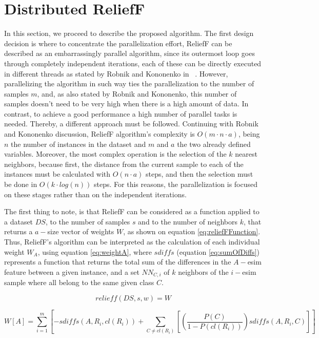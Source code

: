 \section{Distributed ReliefF}
\label{sec:dreliefF}
In this section, we proceed to describe the proposed algorithm. The first design decision is where to concentrate the parallelization effort, ReliefF can be described as an embarrassingly parallel algorithm, since its outermost loop goes through completely independent iterations, each of these can be directly executed in different threads as stated by Robnik and Kononenko in ~\cite{Robnik2003}. However, parallelizing the algorithm in such way ties the parallelization to the number of samples $m$, and, as also stated by Robnik and Kononenko, this number of samples doesn't need to be very high when there is a high amount of data. In contrast, to achieve a good performance a high number of parallel tasks is needed. Thereby, a different approach must be followed. Continuing with Robnik and Kononenko discussion, ReliefF algorithm's complexity is $O(m \cdot n \cdot a)$, being $n$ the number of instances in the dataset and $m$ and $a$ the two already defined variables. Moreover, the most complex operation is the selection of the $k$ nearest neighbors, because first, the distance from the current sample to each of the instances must be calculated with $O(n \cdot a)$ steps, and then the selection must be done in $O(k \cdot log(n))$ steps. For this reasons, the parallelization is focused on these stages rather than on the independent iterations.

The first thing to note, is that ReliefF can be considered as a function applied to a dataset $DS$, to the number of samples $s$ and  to the number of neighbors $k$, that returns a $a-$size vector of weights $W$, as shown on equation \ref{eq:reliefFFunction}. Thus, ReliefF's algorithm can be interpreted as the calculation of each individual weight $W_A$, using equation \ref{eq:weightA}, where $sdiffs$ (equation \ref{eq:sumOfDiffs}) represents a function that returns the total sum of the differences in the $A-$esim feature between a given instance, and a set $NN_{C,i}$ of $k$ neighbors of the $i-$esim sample where all belong to the same given class $C$.

\begin{equation}
\label{eq:reliefFFunction}
relieff(DS,s,w) = W
\end{equation}

\begin{equation}
\label{eq:weightA}
W[A] = \sum_{i = 1}^{m} \left [ -sdiffs(A, R_i, cl(R_i)) + \sum_{C \neq cl(R_i)} \left [ \left ( \frac{P(C)}{1 - P(cl(R_i))} \right )
sdiffs(A,R_i,C) \right ] \right ]
\end{equation}

